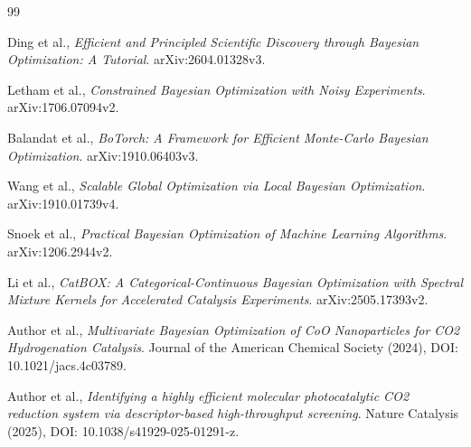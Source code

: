 \documentclass[12pt,a4paper]{article}
\begin{document}
\newpage
\begin{thebibliography}{99}

Ding et al., \textit{Efficient and Principled Scientific Discovery through Bayesian Optimization: A Tutorial}. arXiv:2604.01328v3.

Letham et al., \textit{Constrained Bayesian Optimization with Noisy Experiments}. arXiv:1706.07094v2.

Balandat et al., \textit{BoTorch: A Framework for Efficient Monte-Carlo Bayesian Optimization}. arXiv:1910.06403v3.

Wang et al., \textit{Scalable Global Optimization via Local Bayesian Optimization}. arXiv:1910.01739v4.

Snoek et al., \textit{Practical Bayesian Optimization of Machine Learning Algorithms}. arXiv:1206.2944v2.

Li et al., \textit{CatBOX: A Categorical-Continuous Bayesian Optimization with Spectral Mixture Kernels for Accelerated Catalysis Experiments}. arXiv:2505.17393v2.

Author et al., \textit{Multivariate Bayesian Optimization of CoO Nanoparticles for CO2 Hydrogenation Catalysis}. Journal of the American Chemical Society (2024), DOI: 10.1021/jacs.4c03789.

Author et al., \textit{Identifying a highly efficient molecular photocatalytic CO2 reduction system via descriptor-based high-throughput screening}. Nature Catalysis (2025), DOI: 10.1038/s41929-025-01291-z.

\end{thebibliography}
\end{document}
